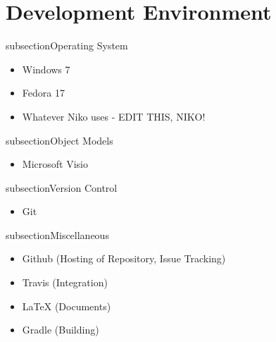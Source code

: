 \section{Development Environment}

\*subsection{Operating System}
\begin{itemize}
\item Windows 7
\item Fedora 17
\item Whatever Niko uses - EDIT THIS, NIKO!
\end{itemize}
\*subsection{Object Models}
\begin{itemize}
\item Microsoft Visio
\end{itemize}
\*subsection{Version Control}
\begin{itemize}
\item Git
\end{itemize}
\*subsection{Miscellaneous}
\begin{itemize}
\item Github (Hosting of Repository, Issue Tracking)
\item Travis (Integration)
\item {\LaTeX} (Documents)
\item Gradle (Building)
\end{itemize}